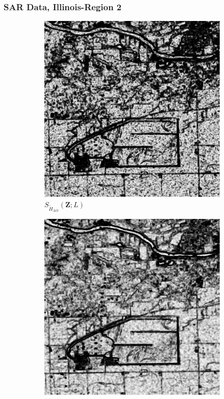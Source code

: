 \documentclass[aspectratio=1610,10pt]{beamer}
\begin{document}
\begin{frame} \frametitle{\large{SAR Data, Illinois-Region 2 }}\vspace{-0.1cm}
\begin{figure}[H]
  \centering
  \begin{subfigure}[b]{0.3\textwidth}
    \centering
    \includegraphics[width=\textwidth]{../../Figures/PNG/H_pvalue_Illinois_1024_36L_AO_200b}
    \caption{$S_{\widetilde{H}_{\text{AO}}}(\bm{Z}; L)$}
    \label{fig:Illinois_crops_pvalue-1}
  \end{subfigure}
  \hfill
  \begin{subfigure}[b]{0.3\textwidth}
    \centering
    \includegraphics[width=\textwidth]{../../Figures/PNG/cv_pvalues_Illinois_crops_1024}

\end{subfigure}
\end{figure}
\end{frame}
\end{document}
